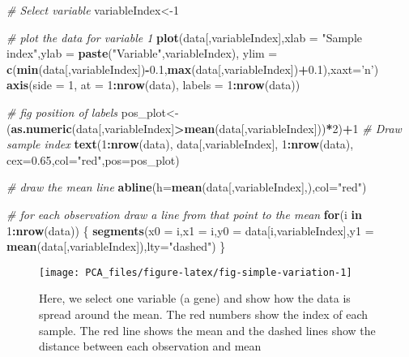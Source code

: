 \documentclass[
]{book}
\newenvironment{Shaded}{\begin{snugshade}}{\end{snugshade}}
\newcommand{\CommentTok}[1]{\textcolor[rgb]{0.56,0.35,0.01}{\textit{#1}}}
\newcommand{\ControlFlowTok}[1]{\textcolor[rgb]{0.13,0.29,0.53}{\textbf{#1}}}
\newcommand{\DataTypeTok}[1]{\textcolor[rgb]{0.13,0.29,0.53}{#1}}
\newcommand{\DecValTok}[1]{\textcolor[rgb]{0.00,0.00,0.81}{#1}}
\newcommand{\FloatTok}[1]{\textcolor[rgb]{0.00,0.00,0.81}{#1}}
\newcommand{\KeywordTok}[1]{\textcolor[rgb]{0.13,0.29,0.53}{\textbf{#1}}}
\newcommand{\NormalTok}[1]{#1}
\newcommand{\OperatorTok}[1]{\textcolor[rgb]{0.81,0.36,0.00}{\textbf{#1}}}
\newcommand{\StringTok}[1]{\textcolor[rgb]{0.31,0.60,0.02}{#1}}
\theoremstyle{definition}
\theoremstyle{definition}
\theoremstyle{definition}
\theoremstyle{remark}
\begin{document}
\begin{Shaded}
\begin{Highlighting}[]
\CommentTok{# Select variable}
\NormalTok{variableIndex<-}\DecValTok{1}

\CommentTok{# plot the data for variable 1}
\KeywordTok{plot}\NormalTok{(data[,variableIndex],}\DataTypeTok{xlab =} \StringTok{"Sample index"}\NormalTok{,}\DataTypeTok{ylab =} \KeywordTok{paste}\NormalTok{(}\StringTok{"Variable"}\NormalTok{,variableIndex),}
     \DataTypeTok{ylim =} \KeywordTok{c}\NormalTok{(}\KeywordTok{min}\NormalTok{(data[,variableIndex])}\OperatorTok{-}\FloatTok{0.1}\NormalTok{,}\KeywordTok{max}\NormalTok{(data[,variableIndex])}\OperatorTok{+}\FloatTok{0.1}\NormalTok{),}\DataTypeTok{xaxt=}\StringTok{'n'}\NormalTok{)}
\KeywordTok{axis}\NormalTok{(}\DataTypeTok{side =} \DecValTok{1}\NormalTok{, }\DataTypeTok{at =} \DecValTok{1}\OperatorTok{:}\KeywordTok{nrow}\NormalTok{(data), }\DataTypeTok{labels =} \DecValTok{1}\OperatorTok{:}\KeywordTok{nrow}\NormalTok{(data))}

\CommentTok{# fig position of labels}
\NormalTok{pos_plot<-(}\KeywordTok{as.numeric}\NormalTok{(data[,variableIndex]}\OperatorTok{>}\KeywordTok{mean}\NormalTok{(data[,variableIndex]))}\OperatorTok{*}\DecValTok{2}\NormalTok{)}\OperatorTok{+}\DecValTok{1}
\CommentTok{# Draw sample index}
\KeywordTok{text}\NormalTok{(}\DecValTok{1}\OperatorTok{:}\KeywordTok{nrow}\NormalTok{(data), data[,variableIndex],  }\DecValTok{1}\OperatorTok{:}\KeywordTok{nrow}\NormalTok{(data),}
     \DataTypeTok{cex=}\FloatTok{0.65}\NormalTok{,}\DataTypeTok{col=}\StringTok{"red"}\NormalTok{,}\DataTypeTok{pos=}\NormalTok{pos_plot)}

\CommentTok{# draw the mean line}
\KeywordTok{abline}\NormalTok{(}\DataTypeTok{h=}\KeywordTok{mean}\NormalTok{(data[,variableIndex],),}\DataTypeTok{col=}\StringTok{"red"}\NormalTok{)}

\CommentTok{# for each observation draw a line from that point to the mean}
\ControlFlowTok{for}\NormalTok{(i }\ControlFlowTok{in} \DecValTok{1}\OperatorTok{:}\KeywordTok{nrow}\NormalTok{(data))}
\NormalTok{\{}
  \KeywordTok{segments}\NormalTok{(}\DataTypeTok{x0 =}\NormalTok{ i,}\DataTypeTok{x1 =}\NormalTok{ i,}\DataTypeTok{y0 =}\NormalTok{ data[i,variableIndex],}\DataTypeTok{y1 =} \KeywordTok{mean}\NormalTok{(data[,variableIndex]),}\DataTypeTok{lty=}\StringTok{"dashed"}\NormalTok{)}
\NormalTok{\}}
\end{Highlighting}
\end{Shaded}

\begin{figure}

{\centering \texttt{[image: PCA\_files/figure-latex/fig-simple-variation-1]} 

}

\caption{Here, we select one variable (a gene) and show how the data is spread around the mean. The red numbers show the index of each sample. The red line shows the mean and the dashed lines show the distance between each observation and mean}\label{fig:fig-simple-variation}
\end{figure}
\end{document}
